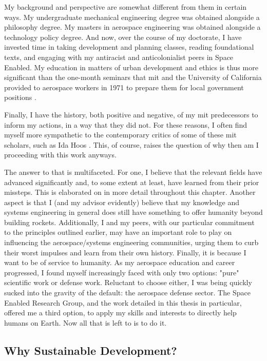 My background and perspective are somewhat different from them in certain ways. My undergraduate mechanical engineering degree was obtained alongside a philosophy degree. My masters in aerospace engineering was obtained alongside a technology policy degree. And now, over the course of my doctorate, I have invested time in taking development and planning classes, reading foundational texts, and engaging with my antiracist and anticolonialist peers in Space Enabled. My education in matters of urban development and ethics is thus more significant than the one-month seminars that \ac{mit} and the University of California provided to aerospace workers in 1971 to prepare them for local government positions \cite{lightWarfareWelfareDefense2005}. 

Finally, I have the history, both positive and negative, of my \ac{mit} predecessors to inform my actions, in a way that they did not. For these reasons, I often find myself more sympathetic to the contemporary critics of some of these \ac{mit} scholars, such as Ida Hoos \cite{hoosSystemsAnalysisPublic1983}. This, of course, raises the question of why then am I proceeding with this work anyways.	

The answer to that is multifaceted. For one, I believe that the relevant fields have advanced significantly and, to some extent at least, have learned from their prior missteps. This is elaborated on in more detail throughout this chapter. Another aspect is that I (and my advisor evidently) believe that my knowledge and systems engineering in general does still have something to offer humanity beyond building rockets. Additionally, I and my peers, with our particular commitment to the principles outlined earlier, may have an important role to play on influencing the aerospace/systems engineering communities, urging them to curb their worst impulses and learn from their own history. Finally, it is because I want to be of service to humanity. As my aerospace education and career progressed, I found myself increasingly faced with only two options: "pure" scientific work or defense work. Reluctant to choose either, I was being quickly sucked into the gravity of the default: the aerospace defense sector. The Space Enabled Research Group, and the work detailed in this thesis in particular, offered me a third option, to apply my skills and interests to directly help humans on Earth. Now all that is left to is to do it.

\subsection{Why Sustainable Development?} \label{sec:sustainable_development}

